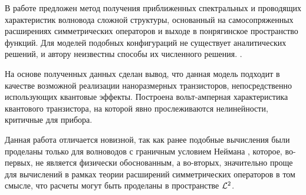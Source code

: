\startconclusionpage

В работе предложен метод получения приближенных спектральных и проводящих характеристик волновода сложной структуры, основанный на самосопряженных расширениях симметрических операторов и выходе в понрягинское пространство функций. Для моделей подобных конфигураций не существует аналитических решений, и автору неизвестны способы их численного решения. .

На основе полученных данных сделан вывод, что данная модель подходит в качестве возможной реализации наноразмерных транзисторов, непосредственно использующих квантовые эффекты. Построена вольт-амперная характеристика квантового транзистора, на которой явно прослеживаются нелинейности, критичные для прибора.

Данная работа отличается новизной, так как ранее подобные вычисления были проделаны только для волноводов с граничным условием Неймана , которое, во-первых, не является физически обоснованным, а во-вторых, значительно проще для вычислений в рамках теории расширений симметрических операторов в том смысле, что расчеты могут быть проделаны в пространстве $\mathcal{L}^2$. 